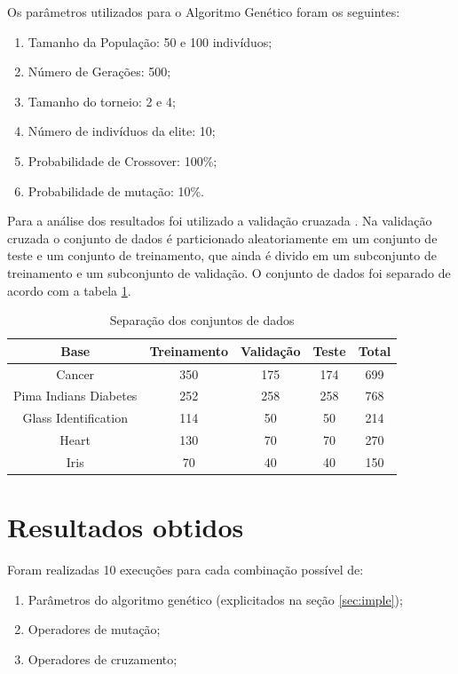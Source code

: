 \documentclass[12pt]{article}
\begin{document}
\par Os parâmetros utilizados para o Algoritmo Genético foram os seguintes:
\begin{enumerate}
	\item Tamanho da População: 50 e 100 indivíduos;
	\item Número de Gerações: 500;
	\item Tamanho do torneio: 2 e 4;
	\item Número de indivíduos da elite: 10;
	\item Probabilidade de Crossover: 100\%;
	\item Probabilidade de mutação: 10\%.
\end{enumerate}

\par Para a análise dos resultados foi utilizado a validação cruazada \cite{Haykin:1998:NNC:521706}. Na validação cruzada o conjunto de dados é particionado aleatoriamente em um conjunto de teste e um conjunto de treinamento, que ainda é divido em um subconjunto de treinamento e um subconjunto de validação. O conjunto de dados foi separado de acordo com a tabela \ref{tab:db}.

\begin{table}
\center
\begin{tabular}{|c|c|c|c|c|}
\hline Base & Treinamento & Validação & Teste  & Total \\ 
\hline Cancer & 350 & 175 & 174 & 699 \\ 
\hline Pima Indians Diabetes & 252 & 258 & 258 & 768 \\ 
\hline Glass Identification & 114 & 50 & 50 & 214 \\ 
\hline Heart & 130 & 70 & 70 & 270 \\ 
\hline Iris & 70 & 40 & 40 & 150 \\ 
\hline 
\end{tabular} 
\caption{Separação dos conjuntos de dados}
\label{tab:db}
\end{table}


\section{Resultados obtidos}

Foram realizadas 10 execuções para cada combinação possível de:
\begin{enumerate}
\item Parâmetros do algoritmo genético (explicitados na seção \ref{sec:imple});
\item Operadores de mutação;
\item Operadores de cruzamento;
\end{enumerate}
\end{document}
